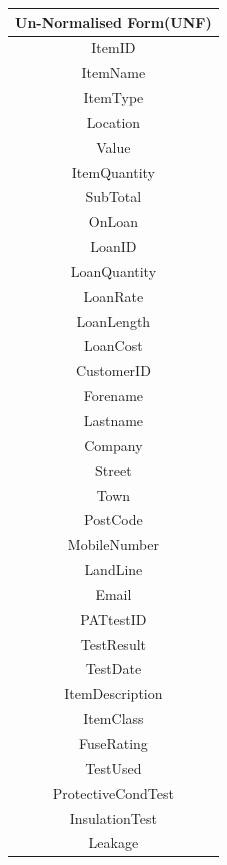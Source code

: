\begin{center}
    \begin{tabular}{|c|}
        \hline
        \textbf{Un-Normalised Form(UNF)}\\ \hline
        ItemID\\ \hline
        ItemName\\ \hline
        ItemType\\ \hline
        Location\\ \hline
        Value\\ \hline
        ItemQuantity\\ \hline
        SubTotal\\ \hline
        OnLoan\\ \hline
        LoanID\\ \hline
        LoanQuantity\\ \hline
        LoanRate\\ \hline
        LoanLength\\ \hline
        LoanCost\\ \hline
        CustomerID\\ \hline
        Forename\\ \hline
        Lastname\\ \hline
        Company\\ \hline
        Street\\ \hline
        Town\\ \hline
        PostCode\\ \hline
        MobileNumber\\ \hline
        LandLine\\ \hline
        Email\\ \hline
        PATtestID\\\hline
        TestResult\\ \hline
        TestDate\\ \hline
        ItemDescription\\ \hline
        ItemClass\\ \hline
        FuseRating\\ \hline
        TestUsed\\ \hline
        ProtectiveCondTest\\ \hline
        InsulationTest\\ \hline
        Leakage\\ \hline
    \end{tabular}
\end{center}

\newpage

